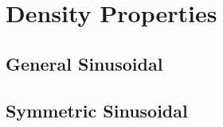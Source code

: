 \section{Density Properties}

\subsection{General Sinusoidal}

\subsection{Symmetric Sinusoidal}






